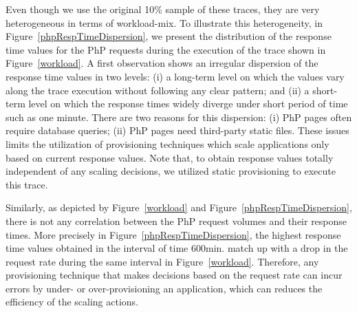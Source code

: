 
Even though we use the original 10\% sample of these traces, they are very heterogeneous in terms of workload-mix. To illustrate this heterogeneity, in Figure~\ref{phpRespTimeDispersion}, we present the distribution of the response time values for the PhP requests during the execution of the trace shown in Figure~\ref{workload}. A first observation shows an irregular dispersion of the response time values in two levels: (i) a long-term level on which the values vary along the trace execution without following any clear pattern; and (ii) a short-term level on which the response times widely diverge under short period of time such as one minute. There are two reasons for this dispersion: (i) PhP pages often require database queries; (ii) PhP pages need third-party static files. These issues limits the utilization of provisioning techniques which scale applications only based on current response values. Note that, to obtain response values totally independent of any scaling decisions, we utilized static provisioning to execute this trace. 

Similarly, as depicted by Figure~\ref{workload} and Figure~\ref{phpRespTimeDispersion}, there is not any correlation between the PhP request volumes and their response times. More precisely in Figure~\ref{phpRespTimeDispersion}, the highest response time values obtained in the interval of time 600min. match up with a drop in the request rate during the same interval in Figure~\ref{workload}. Therefore, any provisioning technique that makes decisions based on the request rate can incur errors by under- or over-provisioning an application, which can reduces the efficiency of the scaling actions. 



